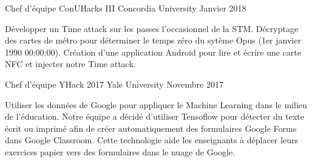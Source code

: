

\begin{cventries}

  \cventry
    {Chef d’équipe}
    {ConUHacks III}
    {Concordia University}
    {Janvier 2018}
    {
      \begin{cvitems}
        \item {Développer un Time attack sur les passes l'occasionnel de la STM. Décryptage des cartes de métro pour déterminer le temps zéro du sytème Opus (1er janvier 1990 00:00:00). Création d'une application Android pour lire et écrire une carte NFC et injecter notre Time attack.}
      \end{cvitems}
    }

  \cventry
    {Chef d’équipe}
    {YHack 2017}
    {Yale University}
    {Novembre 2017}
    {
      \begin{cvitems}
        \item {Utiliser les données de Google pour appliquer le Machine Learning dans le milieu de l’éducation. Notre équipe a décidé d’utiliser Tensoflow pour détecter du texte écrit ou imprimé afin de créer automatiquement des formulaires Google Forms dans Google Classroom. Cette technologie aide les enseignants à déplacer leurs exercices papier vers des formulaires dans le nuage de Google.}
      \end{cvitems}
    }

\end{cventries}